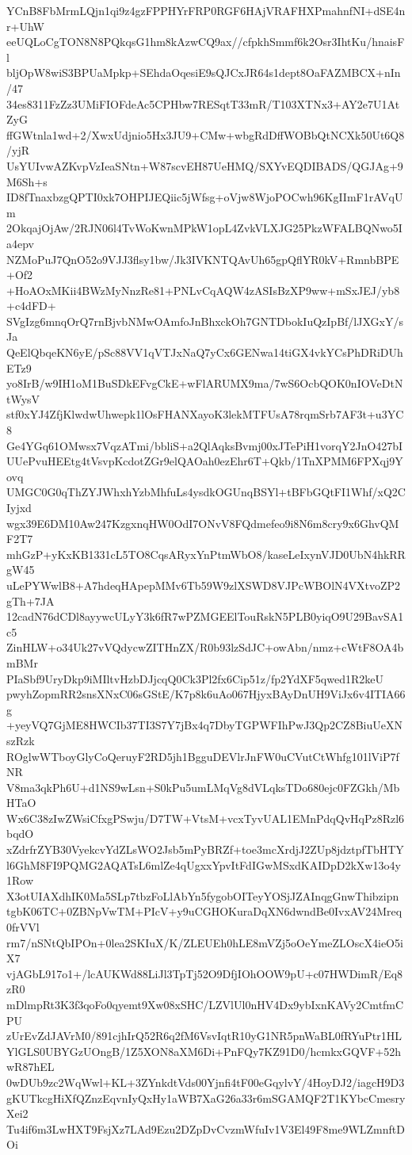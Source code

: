 YCnB8FbMrmLQjn1qi9z4gzFPPHYrFRP0RGF6HAjVRAFHXPmahnfNI+dSE4nr+UhW
eeUQLoCgTON8N8PQkqsG1hm8kAzwCQ9ax//cfpkhSmmf6k2Osr3IhtKu/hnaisFl
bljOpW8wiS3BPUaMpkp+SEhdaOqesiE9sQJCxJR64s1dept8OaFAZMBCX+nIn/47
34es8311FzZz3UMiFIOFdeAc5CPHbw7RESqtT33mR/T103XTNx3+AY2e7U1AtZyG
ffGWtnla1wd+2/XwxUdjnio5Hx3JU9+CMw+wbgRdDffWOBbQtNCXk50Ut6Q8/yjR
UsYUIvwAZKvpVzIeaSNtn+W87scvEH87UeHMQ/SXYvEQDIBADS/QGJAg+9M6Sh+s
ID8fTnaxbzgQPTI0xk7OHPIJEQiic5jWfsg+oVjw8WjoPOCwh96KgIImF1rAVqUm
2OkqajOjAw/2RJN06l4TvWoKwnMPkW1opL4ZvkVLXJG25PkzWFALBQNwo5Ia4epv
NZMoPuJ7QnO52o9VJJ3flsy1bw/Jk3IVKNTQAvUh65gpQflYR0kV+RmnbBPE+Of2
+HoAOxMKii4BWzMyNnzRe81+PNLvCqAQW4zASIsBzXP9ww+mSxJEJ/yb8+c4dFD+
SVgIzg6mnqOrQ7rnBjvbNMwOAmfoJnBhxckOh7GNTDbokIuQzIpBf/lJXGxY/sJa
QeElQbqeKN6yE/pSc88VV1qVTJxNaQ7yCx6GENwa14tiGX4vkYCsPhDRiDUhETz9
yo8IrB/w9IH1oM1BuSDkEFvgCkE+wFlARUMX9ma/7wS6OcbQOK0nIOVeDtNtWysV
stf0xYJ4ZfjKlwdwUhwepk1lOsFHANXayoK3lekMTFUsA78rqmSrb7AF3t+u3YC8
Ge4YGq61OMwsx7VqzATmi/bbliS+a2QlAqksBvmj00xJTePiH1vorqY2JnO427bI
UUePvuHEEtg4tVsvpKcdotZGr9elQAOah0ezEhr6T+Qkb/1TnXPMM6FPXqj9Yovq
UMGC0G0qThZYJWhxhYzbMhfuLs4ysdkOGUnqBSYl+tBFbGQtFI1Whf/xQ2CIyjxd
wgx39E6DM10Aw247KzgxnqHW0OdI7ONvV8FQdmefeo9i8N6m8cry9x6GhvQMF2T7
mhGzP+yKxKB1331cL5TO8CqsARyxYnPtmWbO8/kaseLeIxynVJD0UbN4hkRRgW45
uLePYWwlB8+A7hdeqHApepMMv6Tb59W9zlXSWD8VJPcWBOlN4VXtvoZP2gTh+7JA
12cadN76dCDl8ayywcULyY3k6fR7wPZMGEElTouRskN5PLB0yiqO9U29BavSA1c5
ZinHLW+o34Uk27vVQdycwZITHnZX/R0b93lzSdJC+owAbn/nmz+cWtF8OA4bmBMr
PIaSbf9UryDkp9iMIltvHzbDJjcqQ0Ck3Pl2fx6Cip51z/fp2YdXF5qwed1R2keU
pwyhZopmRR2snsXNxC06sGStE/K7p8k6uAo067HjyxBAyDnUH9ViJx6v4ITIA66g
+yeyVQ7GjME8HWCIb37TI3S7Y7jBx4q7DbyTGPWFIhPwJ3Qp2CZ8BiuUeXNszRzk
ROglwWTboyGlyCoQeruyF2RD5jh1BgguDEVlrJnFW0uCVutCtWhfg101lViP7fNR
V8ma3qkPh6U+d1NS9wLsn+S0kPu5umLMqVg8dVLqksTDo680ejc0FZGkh/MbHTaO
Wx6C38zIwZWsiCfxgPSwju/D7TW+VtsM+vcxTyvUAL1EMnPdqQvHqPz8Rzl6bqdO
xZdrfrZYB30VyekcvYdZLsWO2Jsb5mPyBRZf+toe3mcXrdjJ2ZUp8jdztpfTbHTY
l6GhM8FI9PQMG2AQATsL6mlZe4qUgxxYpvItFdIGwMSxdKAIDpD2kXw13o4y1Row
X3otUIAXdhIK0Ma5SLp7tbzFoLlAbYn5fygobOITeyYOSjJZAInqgGnwThibzipn
tgbK06TC+0ZBNpVwTM+PIcV+y9uCGHOKuraDqXN6dwndBe0IvxAV24Mreq0frVVl
rm7/nSNtQbIPOn+0lea2SKIuX/K/ZLEUEh0hLE8mVZj5oOeYmeZLOscX4ieO5iX7
vjAGbL917o1+/lcAUKWd88LiJl3TpTj52O9DfjIOhOOW9pU+c07HWDimR/Eq8zR0
mDlmpRt3K3f3qoFo0qyemt9Xw08xSHC/LZVlUl0nHV4Dx9ybIxnKAVy2CmtfmCPU
zUrEvZdJAVrM0/891cjhIrQ52R6q2fM6VsvIqtR10yG1NR5pnWaBL0fRYuPtr1HL
YlGLS0UBYGzUOngB/1Z5XON8aXM6Di+PnFQy7KZ91D0/hcmkxGQVF+52hwR87hEL
0wDUb9zc2WqWwl+KL+3ZYnkdtVds00Yjnfi4tF00eGqylvY/4HoyDJ2/iagcH9D3
gKUTkcgHiXfQZnzEqvnIyQxHy1aWB7XaG26a33r6mSGAMQF2T1KYbcCmesryXei2
Tu4if6m3LwHXT9FsjXz7LAd9Ezu2DZpDvCvzmWfuIv1V3El49F8me9WLZmnftDOi
